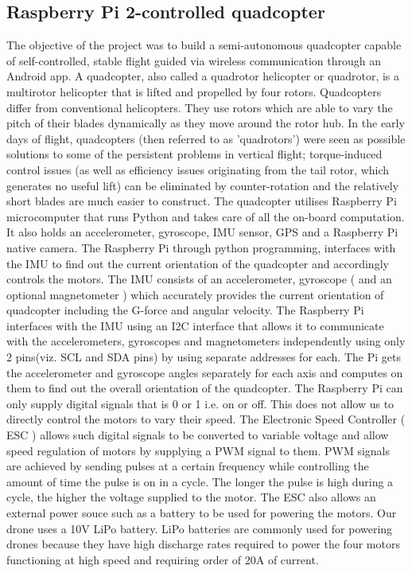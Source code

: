 \subsection{Raspberry Pi 2-controlled quadcopter}
The objective of the project was to build a semi-autonomous quadcopter capable of self-controlled, stable flight guided via wireless communication through an Android app. 
A quadcopter, also called a quadrotor helicopter or quadrotor, is a multirotor helicopter that is lifted and propelled by four rotors. Quadcopters differ from conventional helicopters. They use rotors which are able to vary the pitch of their blades dynamically as they move around the rotor hub. In the early days of flight, quadcopters (then referred to as 'quadrotors') were seen as possible solutions to some of the persistent problems in vertical flight; torque-induced control issues (as well as efficiency issues originating from the tail rotor, which generates no useful lift) can be eliminated by counter-rotation and the relatively short blades are much easier to construct.
The quadcopter utilises Raspberry Pi microcomputer that runs Python and takes care of all the on-board computation. It also holds an accelerometer, gyroscope, IMU sensor, GPS and a Raspberry Pi native camera.
The Raspberry Pi through python programming, interfaces with the IMU to find out the current orientation of the quadcopter and accordingly controls the motors. The IMU consists of an accelerometer, gyroscope ( and an optional magnetometer ) which accurately provides the current orientation of quadcopter including the G-force and angular velocity. The Raspberry Pi interfaces with the IMU using an I2C interface that allows it to communicate with the accelerometers, gyroscopes and magnetometers independently using only 2 pins(viz. SCL and SDA pins) by using separate addresses for each. The Pi gets the accelerometer and gyroscope angles separately for each axis and computes on them to find out the overall orientation of the quadcopter.
The Raspberry Pi can only supply digital signals that is 0 or 1 i.e. on or off. This does not allow us to directly control the motors to vary their speed. The Electronic Speed Controller ( ESC ) allows such digital signals to be converted to variable voltage and allow speed regulation of motors by supplying a PWM signal to them. PWM signals are achieved by sending pulses at a certain frequency while controlling the amount of time the pulse is on in a cycle. The longer the pulse is high during a cycle, the higher the voltage supplied to the motor. The ESC also allows an external power souce such as a battery to be used for powering the motors. Our drone uses a 10V LiPo battery. LiPo batteries are commonly used for powering drones because they have high discharge rates required to power the four motors functioning at high speed and requiring order of 20A of current. 

